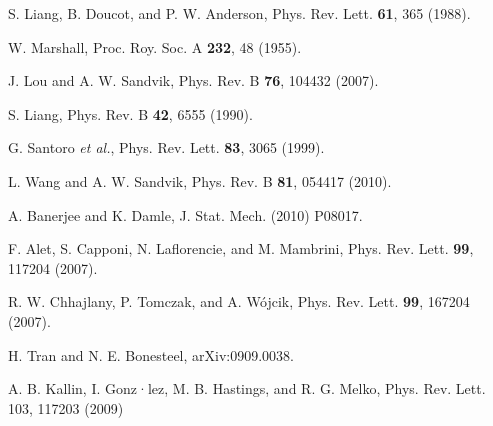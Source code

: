 \documentclass[draft,numberedheadings]{aipproc}
\begin{document}
\begin{thebibliography}{999}
S. Liang, B. Doucot, and P. W. Anderson, Phys. Rev. Lett. {\bf 61}, 365 (1988).

W. Marshall, Proc. Roy. Soc. A {\bf 232}, 48 (1955).

J. Lou and A. W. Sandvik, Phys. Rev. B {\bf 76}, 104432 (2007). 

S. Liang, Phys. Rev. B {\bf 42}, 6555 (1990).

G. Santoro {\it et al.}, Phys. Rev. Lett. {\bf 83}, 3065 (1999).

L. Wang and A. W. Sandvik, Phys. Rev. B {\bf 81}, 054417 (2010). 

A. Banerjee and K. Damle,  J. Stat. Mech. (2010) P08017.

F. Alet, S. Capponi, N. Laflorencie, and M. Mambrini, Phys. Rev. Lett. {\bf 99}, 117204 (2007).

R. W. Chhajlany, P. Tomczak, and A. W\'ojcik, Phys. Rev. Lett. {\bf 99}, 167204 (2007).

H. Tran and N. E. Bonesteel, arXiv:0909.0038. 
 
A. B. Kallin, I. Gonz·lez, M. B. Hastings, and R. G. Melko,
Phys. Rev. Lett. 103, 117203 (2009) 

\end{thebibliography}
\end{document}
